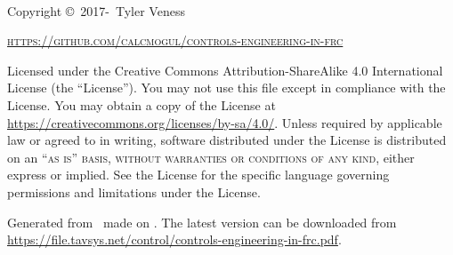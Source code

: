~\vfill
\thispagestyle{empty}

Copyright \copyright\ 2017-\unskip~Tyler Veness

\textsc{\url{https://github.com/calcmogul/controls-engineering-in-frc}}

Licensed under the Creative Commons Attribution-ShareAlike 4.0 International
License (the ``License''). You may not use this file except in compliance with
the License. You may obtain a copy of the License at
\url{https://creativecommons.org/licenses/by-sa/4.0/}. Unless required by
applicable law or agreed to in writing, software distributed under the License
is distributed on an \textsc{``as is'' basis, without warranties or conditions
of any kind}, either express or implied. See the License for the specific
language governing permissions and limitations under the License.

Generated from \unskip~made on
\unskip. The latest version can be downloaded from
\url{https://file.tavsys.net/control/controls-engineering-in-frc.pdf}.
